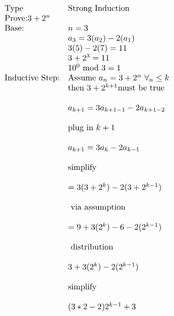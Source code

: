 \documentclass[letterpaper]{article}
\begin{document}
    \section{}
    	\begin{displaymath}
            \begin{array}{llll}
            $Type$ & $Strong Induction$ &&\\
            $Prove:$ 3 + 2^n &&\\
            $Base:$ & n = 3 &&\\
            & a_3 = 3(a_2) - 2(a_1) &&\\
            & 3(5) - 2(7) = 11 &&\\
            & 3 + 2^3 = 11 &&\\
            & 10^0 $ mod $ 3 = 1 &&\\
            $Inductive Step:$ & $Assume $ a_n = 3 + 2^n $ $\forall_n \leq k &&\\
            & $then $3 + 2^{k+1} $must be true $ &&\\
            \\
          	& a_{k+1} = 3a_{k+1-1} - 2a_{k+1-2} &&\\
            \\
            & $plug in $ k+1 &&\\
            \\
            & a_{k+1} = 3a_{k} - 2a_{k-1} &&\\
            \\
            & $simplify$&&\\
            \\
            & = 3(3 + 2^k) - 2(3+2^{k-1}) &&\\
            \\
            & $ via assumption $ &&\\
            \\
            & = 9 + 3(2^k) - 6 - 2(2^{k-1}) &&\\
            \\
            & $ distribution $ &&\\
            \\
            & 3 + 3(2^k) - 2(2^{k-1}) &&\\
            \\
            & $simplify$ &&\\
            \\
            & (3 * 2 - 2)2^{k-1} + 3 &&\\
            \\

\end{array}
\end{displaymath}
\end{document}
